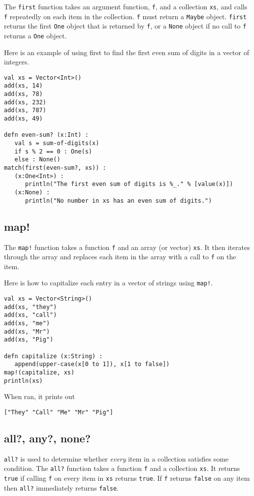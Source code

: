 \documentclass[10pt,oneside]{book}
\begin{document}
The \texttt{\frenchspacing first} function takes an argument function, \texttt{\frenchspacing f}, and a collection \texttt{\frenchspacing xs}, and calls \texttt{\frenchspacing f} repeatedly on each item in the collection. \texttt{\frenchspacing f} must return a \texttt{\frenchspacing Maybe} object. \texttt{\frenchspacing first} returns the first \texttt{\frenchspacing One} object that is returned by \texttt{\frenchspacing f}, or a \texttt{\frenchspacing None} object if no call to \texttt{\frenchspacing f} returns a \texttt{\frenchspacing One} object.

Here is an example of using first to find the first even sum of digits in a vector of integers.
\begin{lstlisting}
val xs = Vector<Int>()
add(xs, 14)
add(xs, 78)
add(xs, 232)
add(xs, 787)
add(xs, 49)

defn even-sum? (x:Int) :
   val s = sum-of-digits(x)
   if s % 2 == 0 : One(s)
   else : None()
match(first(even-sum?, xs)) :
   (x:One<Int>) :
      println("The first even sum of digits is %_." % [value(x)])
   (x:None) :
      println("No number in xs has an even sum of digits.")
\end{lstlisting}

\subsection*{map!}
The \texttt{\frenchspacing map!} function takes a function \texttt{\frenchspacing f} and an array (or vector) \texttt{\frenchspacing xs}. It then iterates through the array and replaces each item in the array with a call to \texttt{\frenchspacing f} on the item. 

Here is how to capitalize each entry in a vector of strings using \texttt{\frenchspacing map!}.
\begin{lstlisting}
val xs = Vector<String>()
add(xs, "they")
add(xs, "call")
add(xs, "me")
add(xs, "Mr")
add(xs, "Pig")   

defn capitalize (x:String) :
   append(upper-case(x[0 to 1]), x[1 to false])
map!(capitalize, xs)
println(xs)
\end{lstlisting}
When ran, it prints out
\begin{lstlisting}
["They" "Call" "Me" "Mr" "Pig"]
\end{lstlisting}

\subsection*{all?, any?, none?}
\texttt{\frenchspacing all?} is used to determine whether {\em every} item in a collection satisfies some condition. The \texttt{\frenchspacing all?} function takes a function \texttt{\frenchspacing f} and a collection \texttt{\frenchspacing xs}. It returns \texttt{\frenchspacing true} if calling \texttt{\frenchspacing f} on every item in \texttt{\frenchspacing xs} returns \texttt{\frenchspacing true}. If \texttt{\frenchspacing f} returns \texttt{\frenchspacing false} on any item then \texttt{\frenchspacing all?} immediately returns \texttt{\frenchspacing false}. 
\end{document}
